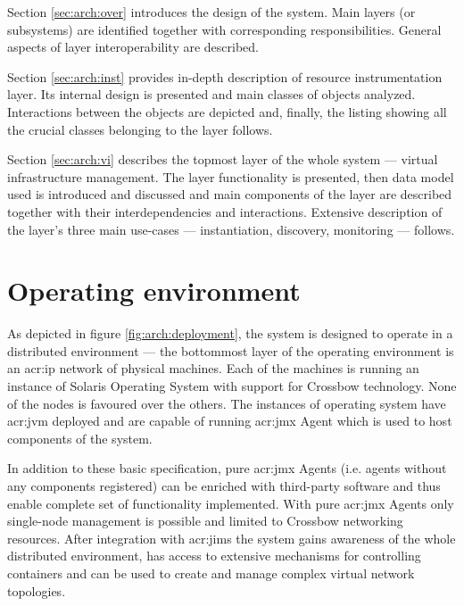 \documentclass[11pt]{book}
\begin{document}
    Section \ref{sec:arch:over} introduces the design of the system. Main layers (or subsystems) are identified together
    with corresponding responsibilities. General aspects of layer interoperability are described.

    Section \ref{sec:arch:inst} provides in-depth description of resource instrumentation layer. Its internal design is
    presented and main classes of objects analyzed. Interactions between the objects are depicted and, finally, the
    listing showing all the crucial classes belonging to the layer follows.

    Section \ref{sec:arch:vi} describes the topmost layer of the whole system --- virtual infrastructure management. The
    layer functionality is presented, then data model used is introduced and discussed and main components of the layer
    are described together with their interdependencies and interactions. Extensive description of the layer's three
    main use-cases --- instantiation, discovery, monitoring --- follows.


    \section{Operating environment}
    \label{sec:arch:env}

      As depicted in figure \ref{fig:arch:deployment}, the system is designed to operate in a distributed environment
      --- the bottommost layer of the operating environment is an \gls{acr:ip} network of physical machines. Each of the
      machines is running an instance of Solaris Operating System with support for Crossbow technology. None of the
      nodes is favoured over the others. The instances of operating system have \gls{acr:jvm} deployed and are capable
      of running \gls{acr:jmx} Agent which is used to host components of the system.

      In addition to these basic specification, pure \gls{acr:jmx} Agents (i.e. agents without any components registered) can be
      enriched with third-party software and thus enable complete set of functionality implemented. With pure \gls{acr:jmx} Agents
      only single-node management is possible and limited to Crossbow networking resources. After integration with \gls{acr:jims}
      the system gains awareness of the whole distributed environment, has access to extensive mechanisms for
      controlling containers and can be used to create and manage complex virtual network topologies.
    
\end{document}
